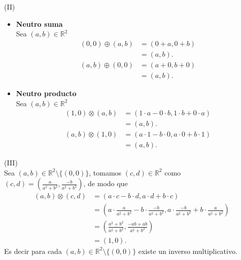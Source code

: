 \documentclass[11pt,letterpaper]{article}
\newcommand{\R}{\mathbb{R}}
\begin{document}
\begin{tcolorbox}
	(II)\\
	\begin{itemize}
		\item \textbf{Neutro suma}\\
		Sea $(a,b)\in\R^2$
		\begin{align*}
			(0,0)\oplus(a,b)&=(0+a,0+b)\\
			&=(a,b).
		\end{align*}
		\begin{align*}
			(a,b)\oplus(0,0)&=(a+0,b+0)\\
			&=(a,b).
		\end{align*}
		\item \textbf{Neutro producto}\\
		Sea $(a,b)\in\R^2$
		\begin{align*}
			(1,0)\otimes(a,b)&=(1\cdot a-0\cdot b,1\cdot b+0\cdot a)\\
			&=(a,b).
		\end{align*}
		\begin{align*}
			(a,b)\otimes(1,0)&=(a\cdot 1-b\cdot 0,a\cdot 0+b\cdot 1)\\
			&=(a,b).
		\end{align*}
	\end{itemize}
\end{tcolorbox}
\begin{tcolorbox}
	(III)\\
	Sea $(a,b)\in\R^2\setminus\{(0,0)\}$, tomamos $(c,d)\in\R^2$ como $(c,d)=\left(\frac{a}{a^2+b^2},\frac{-b}{a^2+b^2}\right)$, de modo que
	\begin{align*}
		(a,b)\otimes(c,d)&=(a\cdot c-b\cdot d,a\cdot d+b\cdot c)\\
		&=(a\cdot\frac{a}{a^2+b^2}-b\cdot\frac{-b}{a^2+b^2},a\cdot\frac{-b}{a^2+b^2}+b\cdot\frac{a}{a^2+b^2})\\
		&=(\frac{a^2+b^2}{a^2+b^2},\frac{-ab+ab}{a^2+b^2})\\
		&=(1,0).
	\end{align*}
	Es decir para cada $(a,b)\in\R^2\setminus\{(0,0)\}$ existe un inverso multiplicativo.
\end{tcolorbox}
\end{document}
